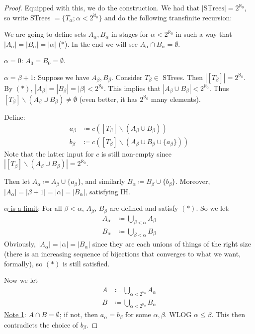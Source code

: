 \documentclass[]{article}
\begin{document}
\begin{proof}
    Equipped with this, we do the construction. We had that $|\textrm{STrees}| = 2^{\aleph_0}$, so write STrees $=\{T_\alpha; \alpha < 2^{\aleph_0}\}$ and do the following transfinite recursion:

    We are going to define sets $A_\alpha,B_\alpha$ in stages for $\alpha < 2^{\aleph_0}$ in such a way that $|A_\alpha| = |B_\alpha| = |\alpha|$ ($\ast$). In the end we will see $A_\alpha \cap B_\alpha = \emptyset$.

    \underline{$\alpha = 0$}: $A_0 = B_0 = \emptyset$.

    \underline{$\alpha = \beta+1$}: Suppose we have $A_\beta,B_\beta$. Consider $T_\beta\in$ STrees. Then $|[T_\beta]| = 2^{\aleph_0}$. By $(\ast)$, $|A_\beta| = |B_\beta| = |\beta|<2^{\aleph_0}$. This implies that $|A_\beta\cup B_\beta|<2^{\aleph_0}$. Thus $[T_\beta]\backslash (A_\beta \cup B_\beta)\ne\emptyset$ (even better, it has $2^{\aleph_0}$ many elements).

    Define:
    \begin{align*}
        a_\beta & \coloneqq c([T_\beta]\backslash(A_\beta\cup B_\beta))\\
        b_\beta & \coloneqq c([T_\beta]\backslash (A_\beta\cup B_\beta\cup \{a_\beta\}))
    \end{align*}
    Note that the latter input for $c$ is still non-empty since $|[T_\beta]\backslash (A_\beta\cup B_\beta)| = 2^{\aleph_0}$.

    Then let $A_\alpha \coloneqq A_\beta \cup \{a_\beta\}$, and similarly $B_\alpha \coloneqq B_\beta\cup\{b_\beta\}$. Moreover, $|A_\alpha| = |\beta + 1| = |\alpha| = |B_\alpha|$, satisfying IH.

    \underline{$\alpha$ is a limit}: For all $\beta < \alpha$, $A_\beta$, $B_\beta$ are defined and satisfy $(\ast)$. So we let:
    \begin{align*}
        A_\alpha &\coloneqq \bigcup_{\beta<\alpha}A_\beta\\
        B_\alpha &\coloneqq \bigcup_{\beta<\alpha}B_\beta
    \end{align*}
    Obviously, $|A_\alpha| = |\alpha| = |B_\alpha|$ since they are each unions of things of the right size (there is an increasing sequence of bijections that converges to what we want, formally), so $(\ast)$ is still satisfied.

    Now we let
    \begin{align*}
        A &\coloneqq \bigcup_{\alpha <2^{\aleph_0}}A_\alpha\\
        B &\coloneqq \bigcup_{\alpha < 2^{\aleph_0}}B_\alpha
    \end{align*}
    \underline{Note 1}: $A\cap B = \emptyset$; if not, then $a_\alpha = b_\beta$ for some $\alpha,\beta$. WLOG $\alpha \le \beta$. This then contradicts the choice of $b_\beta$.


\end{proof}
\end{document}
